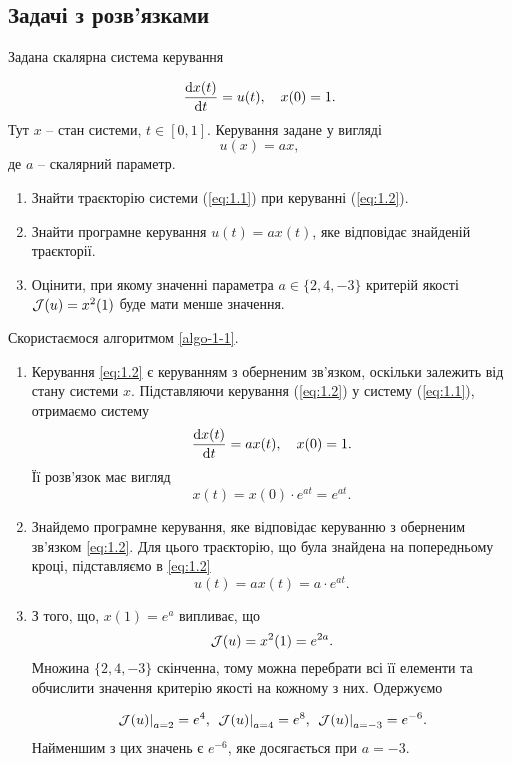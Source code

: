 \subsection{Задачі з розв'язками}

\begin{problem}
	Задана скалярна система керування 
	
	\begin{equation}
		\label{eq:1.1}
		\frac{\mathop{}\!\mathrm{d} x(t)}{\mathop{}\!\mathrm{d} t} = u(t), \quad x(0) = 1.
	\end{equation}
	Тут $x$ -- стан системи, $t \in [0, 1]$. Керування задане у вигляді
	\begin{equation}
		\label{eq:1.2}
		u(x) = a x,
	\end{equation}
	де $a$ -- скалярний параметр.

	\begin{enumerate}
		\item Знайти траєкторію системи (\ref{eq:1.1}) при керуванні (\ref{eq:1.2}).

		\item Знайти програмне керування $u(t) = a x (t)$, яке відповідає знайденій траєкторії. 

		\item Оцінити, при якому значенні параметра $a \in \{2, 4, -3\}$ критерій якості $\mathcal{J}(u) = x^2 (1)$ буде мати менше значення.
	\end{enumerate}
\end{problem}

\begin{solution}
    Скористаємося алгоритмом \ref{algo-1-1}.
    
	\begin{enumerate}
	    \item Керування  \eqref{eq:1.2} є керуванням з оберненим зв'язком, оскільки залежить від стану системи $x$. Підставляючи керування (\ref{eq:1.2}) у систему (\ref{eq:1.1}), отримаємо систему \[ \frac{\mathop{}\!\mathrm{d} x(t)}{\mathop{}\!\mathrm{d} t} = a x(t), \quad x(0) = 1. \]
		Її розв'язок має вигляд \[ x(t) = x(0) \cdot e^{a t} = e^{a t}. \]
		\item Знайдемо програмне керування, яке відповідає керуванню з оберненим зв'язком \eqref{eq:1.2}. Для цього траєкторію, що була знайдена на попередньому кроці, підставляємо в \eqref{eq:1.2} \[ u(t) = a x(t) = a \cdot e^{a t}. \]
		\item З того, що, $x(1) = e^{a}$ випливає, що 
		\[\mathcal{J}(u) = x^2 (1)=e^{2a}.\]
		Множина $\{2, 4, -3\}$ скінченна, тому можна  перебрати всі її елементи та обчислити значення критерію якості на кожному з них. Одержуємо 
		
		\[ \left.\mathcal{J} (u) \right|_{a = 2} = e^4, \  \left. \mathcal{J} (u) \right|_{a = 4} = e^8, \ \left. \mathcal{J} (u) \right|_{a = -3} = e^{-6}. \]
		Найменшим з цих значень є $e^{-6}$, яке досягається при $a = -3$.
	\end{enumerate}
\end{solution}

